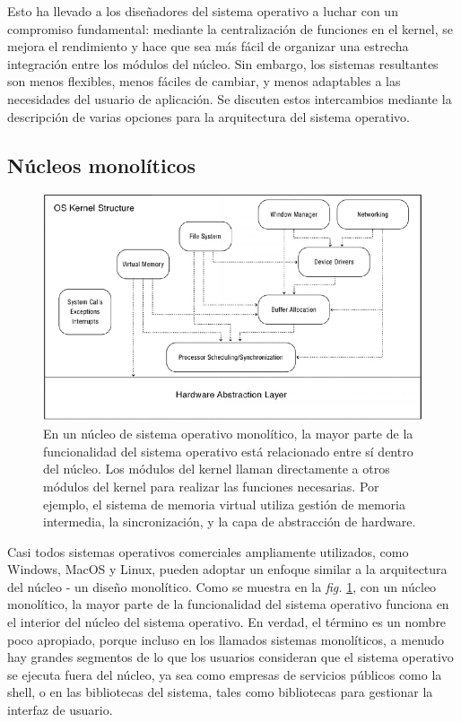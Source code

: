 \documentclass[10pt]{book}
\begin{document}
Esto ha llevado a los diseñadores del sistema operativo a luchar con un compromiso fundamental: mediante la centralización de funciones en el kernel, se mejora el rendimiento y hace que sea más fácil de organizar una estrecha integración entre los módulos del núcleo. Sin embargo, los sistemas resultantes son menos flexibles, menos fáciles de cambiar, y menos adaptables a las necesidades del usuario de aplicación. Se discuten estos intercambios mediante la descripción de varias opciones para la arquitectura del sistema operativo.

\subsection{Núcleos monolíticos}
\begin{figure}[tbhp]
\centerline{\includegraphics[scale=0.45]{img/fig0303}}
\caption{En un núcleo de sistema operativo monolítico, la mayor parte de la funcionalidad del sistema operativo está relacionado entre sí dentro del núcleo. Los módulos del kernel llaman directamente a otros módulos del kernel para realizar las funciones necesarias. Por ejemplo, el sistema de memoria virtual utiliza gestión de memoria intermedia, la sincronización, y la capa de abstracción de hardware.}
\label{fig0303}
\end{figure}

Casi todos sistemas operativos comerciales ampliamente utilizados, como Windows, MacOS y Linux, pueden adoptar un enfoque similar a la arquitectura del núcleo - un diseño monolítico. Como se muestra en la \textit{fig.} \ref{fig0303}, con un núcleo monolítico, la mayor parte de la funcionalidad del sistema operativo funciona en el interior del núcleo del sistema operativo. En verdad, el término es un nombre poco apropiado, porque incluso en los llamados sistemas monolíticos, a menudo hay grandes segmentos de lo que los usuarios consideran que el sistema operativo se ejecuta fuera del núcleo, ya sea como empresas de servicios públicos como la shell, o en las bibliotecas del sistema, tales como bibliotecas para gestionar la interfaz de usuario.
\end{document}
